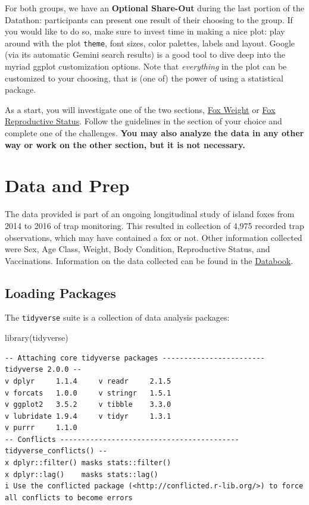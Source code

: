 \documentclass[
  letterpaper,
]{report}
\newenvironment{Shaded}{\begin{snugshade}}{\end{snugshade}}
\newcommand{\FunctionTok}[1]{\textcolor[rgb]{0.28,0.35,0.67}{#1}}
\newcommand{\NormalTok}[1]{\textcolor[rgb]{0.00,0.23,0.31}{#1}}
\begin{document}
For both groups, we have an \textbf{Optional Share-Out} during the last
portion of the Datathon: participants can present one result of their
choosing to the group. If you would like to do so, make sure to invest
time in making a nice plot: play around with the plot \texttt{theme},
font sizes, color palettes, labels and layout. Google (via its automatic
Gemini search results) is a good tool to dive deep into the myriad
ggplot customization options. Note that \emph{everything} in the plot
can be customized to your choosing, that is (one of) the power of using
a statistical package.

As a start, you will investigate one of the two sections,
\hyperref[fox-weight]{Fox Weight} or \hyperref[fox-rs]{Fox Reproductive
Status}. Follow the guidelines in the section of your choice and
complete one of the challenges. \textbf{You may also analyze the data in
any other way or work on the other section, but it is not necessary.}

\section{Data and Prep}\label{intro}

The data provided is part of an ongoing longitudinal study of island
foxes from 2014 to 2016 of trap monitoring. This resulted in collection
of 4,975 recorded trap observations, which may have contained a fox or
not. Other information collected were Sex, Age Class, Weight, Body
Condition, Reproductive Status, and Vaccinations. Information on the
data collected can be found in the
\href{https://github.com/mludkov/UCSB_Data_Day_2026/blob/gh-pages/data_for_datathon_2014_2016.csv}{Databook}.

\subsection{Loading Packages}\label{loading-packages}

The \texttt{tidyverse} suite is a collection of data analysis packages:

\begin{Shaded}
\begin{Highlighting}[]
\FunctionTok{library}\NormalTok{(tidyverse)}
\end{Highlighting}
\end{Shaded}

\begin{verbatim}
-- Attaching core tidyverse packages ------------------------ tidyverse 2.0.0 --
v dplyr     1.1.4     v readr     2.1.5
v forcats   1.0.0     v stringr   1.5.1
v ggplot2   3.5.2     v tibble    3.3.0
v lubridate 1.9.4     v tidyr     1.3.1
v purrr     1.1.0     
-- Conflicts ------------------------------------------ tidyverse_conflicts() --
x dplyr::filter() masks stats::filter()
x dplyr::lag()    masks stats::lag()
i Use the conflicted package (<http://conflicted.r-lib.org/>) to force all conflicts to become errors
\end{verbatim}
\end{document}
